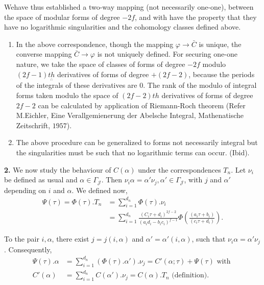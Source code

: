 We\pageoriginale have thus established a two-way mapping (not necessarily one-one),
between the space of modular forms of degree $-2f$, and with have the
property that they have no logarithmic singularities and the
cohomology classes defined above. 

\begin{remarks}
  \begin{enumerate}[\rm (1)]
  \item  In the above correspondence, though the mapping $\varphi \to
    \bar{C}$ is unique, the converse mapping $\bar{C}\longrightarrow
    \varphi$ is not uniquely defined. For securing one-one nature, we
    take the space of classes of forms of degree $-2f$ modulo
    $(2f-1)\underset {\bar{..}}{th}$  derivatives of forms of degree
    $+(2f-2)$, because the periods of the integrals of these
    derivatives are $0$. The rank of the modulo of integral forms
    taken modulo the space of $(2f-2)th$ derivatives of forms of
    degree $2f-2$ can be calculated by application of Riemann-Roch
    theorem (Refer M.Eichler, Eine Verallgemienerung der Abelsche
    Integral, Mathenatische Zeitschrift, $1957$). 
    
    \item The above procedure can be generalized to forms not
    necessarily integral but the singularities must be such that no
    logarithmic terms can occur. (Ibid). 
  \end{enumerate}
\end{remarks}

\textbf{2.} We now study the behaviour of $C(\alpha)$ under the
correspondences $T_n$. Let $\nu _i$ be defined as usual and $\alpha
\in \Gamma _{\mathcal{J}}$. Then $\nu_i \alpha =\alpha' \nu_j,
\alpha' \in \Gamma _{\mathcal{J}}$, with $j$ and $\alpha'$ depending
on $i$ and $\alpha$. We defined now,  
\begin{align*}
  \Psi (\tau)= \Phi(\tau).T_n &= \sum^{d_n}_{i=1} \Phi (\tau). \nu_i\\
  &=\sum^{d_n}_{i=1} \frac{(C_i \tau+ d_i)^{2f-2}}{(a_i d_i-b_i
    c_i)^{f-1}} \Phi \left( \frac{(a_i \tau +b_i)}{(c_i \tau +d_i)}
  \right). 
\end{align*}

To the pair $i,\alpha$, there exist $j=j(i,\alpha)$ and $\alpha'
=\alpha' (i, \alpha)$, such that $\nu_i \alpha=\alpha'
\nu_j$. Consequently, 
\begin{align*}
  \Psi (\tau).\alpha &= \sum^{d_n}_{i=1}(\Phi (\tau).\alpha').\nu_j=C'
  (\alpha;\tau)+\Psi (\tau) \text{ with }\\ 
  C'(\alpha)&= \sum^{d_n}_{i=1} C(\alpha'). \nu_j= C(\alpha).T_n
  \text{ (definition)}. 
\end{align*}

